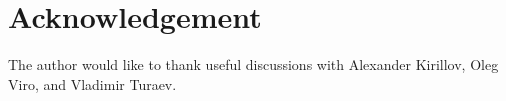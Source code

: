 \section*{Acknowledgement}

The author would like to thank useful discussions with Alexander Kirillov,
Oleg Viro, and Vladimir Turaev.
